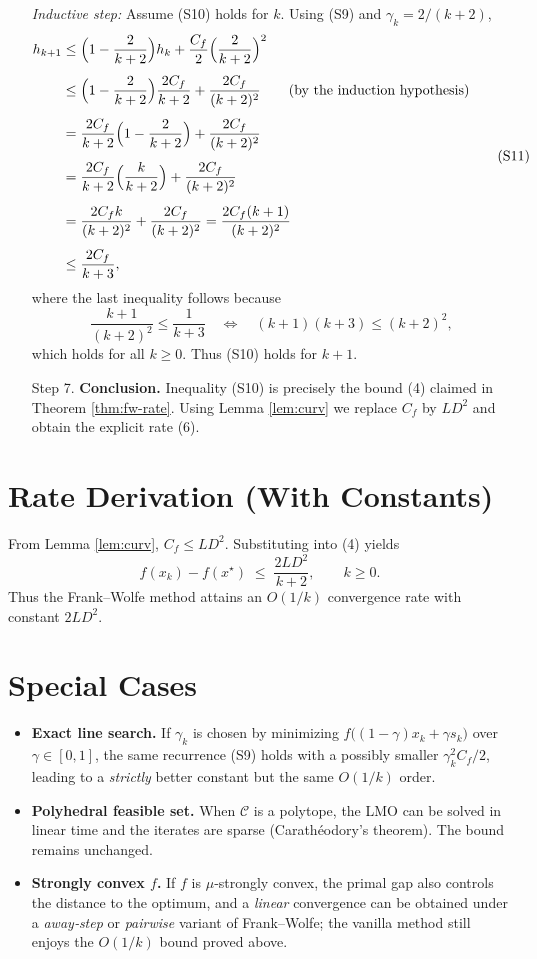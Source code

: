 \documentclass{article}
\newcommand{\Cset}{\mathcal{C}}
\newcommand{\opt}{x^{\star}}
\begin{document}
\begin{enumerate}
\emph{Inductive step:} Assume (S10) holds for $k$.  Using (S9) and $\gamma_{k}=2/(k+2)$,
\[
\begin{aligned}
h_{k+1}
&\le\Bigl(1-\frac{2}{k+2}\Bigr)h_{k}
      +\frac{C_{f}}{2}\Bigl(\frac{2}{k+2}\Bigr)^{2}\\[4pt]
&\le\Bigl(1-\frac{2}{k+2}\Bigr)\frac{2C_{f}}{k+2}
      +\frac{2C_{f}}{(k+2)^{2}}  \qquad\text{(by the induction hypothesis)}\\[4pt]
&= \frac{2C_{f}}{k+2}\Bigl(1-\frac{2}{k+2}\Bigr)+\frac{2C_{f}}{(k+2)^{2}}\\[4pt]
&= \frac{2C_{f}}{k+2}\Bigl(\frac{k}{k+2}\Bigr)+\frac{2C_{f}}{(k+2)^{2}}\\[4pt]
&= \frac{2C_{f}k}{(k+2)^{2}}+\frac{2C_{f}}{(k+2)^{2}}
   =\frac{2C_{f}(k+1)}{(k+2)^{2}}\\[4pt]
&\le \frac{2C_{f}}{k+3},
\end{aligned}
\tag{S11}
\]
where the last inequality follows because
\[
\frac{k+1}{(k+2)^{2}} \le \frac{1}{k+3}\quad\Longleftrightarrow\quad
(k+1)(k+3)\le (k+2)^{2},
\]
which holds for all $k\ge0$.  Thus (S10) holds for $k+1$.

\item[Step 7.] \textbf{Conclusion.}  
Inequality (S10) is precisely the bound (4) claimed in Theorem \ref{thm:fw-rate}.  Using Lemma \ref{lem:curv} we replace $C_{f}$ by $L D^{2}$ and obtain the explicit rate (6).
\end{enumerate}

\section*{Rate Derivation (With Constants)}
From Lemma \ref{lem:curv}, $C_{f}\le L D^{2}$. Substituting into (4) yields
\[
f(x_{k})-f(\opt)\;\le\;\frac{2L D^{2}}{k+2},
\qquad k\ge0.
\]
Thus the Frank–Wolfe method attains an $O(1/k)$ convergence rate with constant $2L D^{2}$.

\section*{Special Cases}
\begin{itemize}
\item \textbf{Exact line search.}  If $\gamma_{k}$ is chosen by minimizing $f\bigl((1-\gamma)x_{k}+\gamma s_{k}\bigr)$ over $\gamma\in[0,1]$, the same recurrence (S9) holds with a possibly smaller $\gamma_{k}^{2}C_{f}/2$, leading to a \emph{strictly} better constant but the same $O(1/k)$ order.
\item \textbf{Polyhedral feasible set.}  When $\Cset$ is a polytope, the LMO can be solved in linear time and the iterates are sparse (Carathéodory’s theorem).  The bound remains unchanged.
\item \textbf{Strongly convex $f$.}  If $f$ is $\mu$‑strongly convex, the primal gap also controls the distance to the optimum, and a \emph{linear} convergence can be obtained under a \emph{away‑step} or \emph{pairwise} variant of Frank–Wolfe; the vanilla method still enjoys the $O(1/k)$ bound proved above.
\end{itemize}
\end{document}
